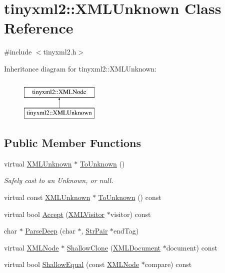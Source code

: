 \hypertarget{classtinyxml2_1_1_x_m_l_unknown}{\section{tinyxml2\+:\+:X\+M\+L\+Unknown Class Reference}
\label{classtinyxml2_1_1_x_m_l_unknown}
}


{\ttfamily \#include $<$tinyxml2.\+h$>$}

Inheritance diagram for tinyxml2\+:\+:X\+M\+L\+Unknown\+:\begin{figure}[H]
\begin{center}
\leavevmode
\includegraphics[height=2.000000cm]{classtinyxml2_1_1_x_m_l_unknown}
\end{center}
\end{figure}
\subsection*{Public Member Functions}
\begin{DoxyCompactItemize}
\item 
virtual \hyperlink{classtinyxml2_1_1_x_m_l_unknown}{X\+M\+L\+Unknown} $\ast$ \hyperlink{classtinyxml2_1_1_x_m_l_unknown_af4374856421921cad578c8affae872b6}{To\+Unknown} ()
\begin{DoxyCompactList}\small\item\em Safely cast to an Unknown, or null. \end{DoxyCompactList}\item 
virtual const \hyperlink{classtinyxml2_1_1_x_m_l_unknown}{X\+M\+L\+Unknown} $\ast$ \hyperlink{classtinyxml2_1_1_x_m_l_unknown_a257987e79955399e6e9f119b58d4bb30}{To\+Unknown} () const 
\item 
virtual bool \hyperlink{classtinyxml2_1_1_x_m_l_unknown_a0d341ab804a1438a474810bb5bd29dd5}{Accept} (\hyperlink{classtinyxml2_1_1_x_m_l_visitor}{X\+M\+L\+Visitor} $\ast$visitor) const 
\item 
char $\ast$ \hyperlink{classtinyxml2_1_1_x_m_l_unknown_a0e4f3509dee42a4d45a7f0002be568cc}{Parse\+Deep} (char $\ast$, \hyperlink{classtinyxml2_1_1_str_pair}{Str\+Pair} $\ast$end\+Tag)
\item 
virtual \hyperlink{classtinyxml2_1_1_x_m_l_node}{X\+M\+L\+Node} $\ast$ \hyperlink{classtinyxml2_1_1_x_m_l_unknown_aa09fc7cb0cd64d6bb9c5ae00ffc549ec}{Shallow\+Clone} (\hyperlink{classtinyxml2_1_1_x_m_l_document}{X\+M\+L\+Document} $\ast$document) const 
\item 
virtual bool \hyperlink{classtinyxml2_1_1_x_m_l_unknown_a0169df157bf69a092b404ca49621ff1a}{Shallow\+Equal} (const \hyperlink{classtinyxml2_1_1_x_m_l_node}{X\+M\+L\+Node} $\ast$compare) const 
\end{DoxyCompactItemize}
